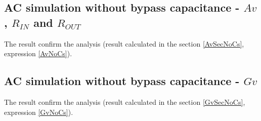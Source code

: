 \documentclass[10pt,a4paper]{book}
\begin{document}
\subsection{AC simulation without bypass capacitance - $Av$, $R_{IN}$ and $R_{OUT}$}

The result confirm the analysis (result calculated in the section \ref{AvSecNoCs}, expression \ref{AvNoCs}).


\subsection{AC simulation without bypass capacitance - $Gv$}

The result confirm the analysis (result calculated in the section \ref{GvSecNoCs}, expression \ref{GvNoCs}).

\end{document}
